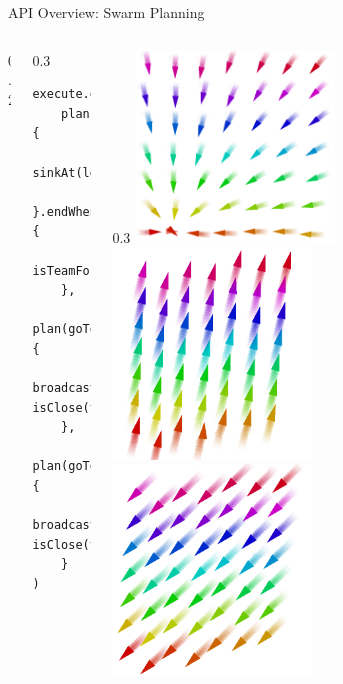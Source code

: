 \documentclass[presentation, 9pt]{beamer}\mode<presentation>{\usetheme{AMSBolognaFC}}
\begin{document}
\begin{frame}[fragile]{API Overview: Swarm Planning}
\begin{columns}
\begin{column}{0.2\textwidth}
\end{column}
\begin{column}{0.3\textwidth}
	\begin{verbatim}
execute.once(
	plan {
		sinkAt(leader)
	}.endWhen {
		isTeamFormed(...)
	},
	plan(goToTop).endWhen {
		broadcast(leader, isClose(targetA))
	},
	plan(goToBottom).endWhen {
		broadcast(leader, isClose(targetB))
	}
)
	\end{verbatim}
\end{column}
\begin{column}{0.3\textwidth}
\centering
\includegraphics[width=0.5\textwidth]{img/go-to.png}
\includegraphics[width=0.5\textwidth]{img/go-to-1.png}
\includegraphics[width=0.5\textwidth]{img/go-to-2.png}
\end{column}

\end{columns}

\end{frame}
\end{document}
